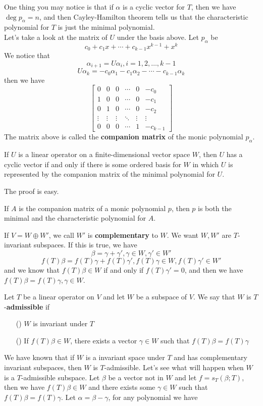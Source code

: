 \documentclass{article}
\begin{document}
One thing you may notice is that if $\alpha$ is a cyclic vector for $T$, then we have $\deg p_\alpha=n$, and then Cayley-Hamilton theorem tells us that the characteristic polynomial for $T$ is just the minimal polynomial.\\
\indent Let's take a look at the matrix of $U$ under the basis above. Let $p_\alpha$ be 
\[c_0+c_1x+\cdots+c_{k-1}x^{k-1}+x^{k}\]
We notice that
\[\alpha_{i+1}=U\alpha_i,i=1,2,\dots,k-1\]
\[U\alpha_k=-c_0\alpha_1-c_1\alpha_2-\cdots-c_{k-1}\alpha_{k}\]
then we have
\[\begin{bmatrix}
	0&0&0&\cdots&0&-c_0\\
	1&0&0&\cdots&0&-c_1\\
	0&1&0&\cdots&0&-c_2\\
	\vdots&\vdots&\vdots&\ddots&\vdots&\vdots\\
	0&0&0&\cdots&1&-c_{k-1}
\end{bmatrix}\]
The matrix above is called the \textbf{companion matrix} of the monic polynomial $p_\alpha$.
\begin{thm}
	If $U$ is a linear operator on a finite-dimensional vector space $W$, then $U$ has a cyclic vector if and only if there is some ordered basis for $W$ in which $U$ is represented by the companion matrix of the minimal polynomial for $U$.
\end{thm}
The proof is easy.
\begin{coro}
	If $A$ is the companion matrix of a monic polynomial $p$, then $p$ is both the minimal and the characteristic polynomial for $A$.
\end{coro}
If $V=W\oplus W'$, we call $W'$ is \textbf{complementary} to $W$. We want $W,W'$ are $T$-invariant subspaces. If this is true, we have
\[\beta=\gamma+\gamma',\gamma\in W,\gamma'\in W'\]
\[f(T)\beta=f(T)\gamma+f(T)\gamma',f(T)\gamma\in W,f(T)\gamma'\in W'\]
and we know that $f(T)\beta\in W$ if and only if $f(T)\gamma'=0$, and then we have $f(T)\beta=f(T)\gamma,\gamma\in W$.
\begin{dde}
	Let $T$ be a linear operator on $V$ and let $W$ be a subspace of $V$. We say that $W$ is $T$-\textbf{admissible} if
	\begin{enumerate}
		\item [(\romannumeral1)]$W$ is invariant under $T$
		\item [(\romannumeral2)]If $f(T)\beta\in W$, there exists a vector $\gamma\in W$ such that $f(T)\beta=f(T)\gamma$
	\end{enumerate}
\end{dde}
We have known that if $W$ is a invariant space under $T$ and has complementary invariant subspaces, then $W$ is $T$-admissible. Let's see what will happen when $W$ is a $T$-admissible subspace. Let $\beta$ be a vector not in $W$ and let $f=s_T(\beta;T)$, then we have $f(T)\beta\in W$ and there exists some $\gamma\in W$ such that $f(T)\beta=f(T)\gamma$. Let $\alpha=\beta-\gamma$, for any polynomial we have
\end{document}
